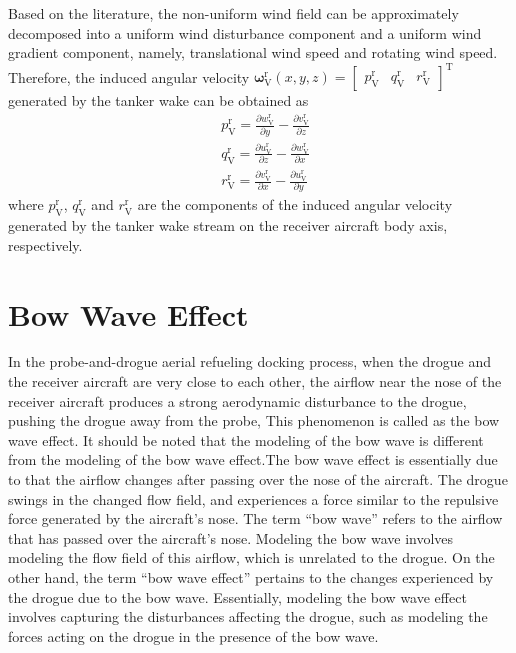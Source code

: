 Based on the literature\cite{pamadi2004performance}, the non-uniform wind field can be approximately decomposed into a uniform wind disturbance component and a uniform wind gradient component, namely, translational wind speed and rotating wind speed. Therefore, the induced angular velocity $\boldsymbol{\omega}_\mathrm{V}^\mathrm{r}\left( {x,y,z} \right) = {\left[ {\begin{array}{*{20}{c}}
		{p_\mathrm{V}^\mathrm{r}}&{q_\mathrm{V}^\mathrm{r}}&{r_\mathrm{V}^\mathrm{r}}
		\end{array}} \right]^\mathrm{T}}$ generated by the tanker wake can be obtained as
\begin{equation}\label{eq19}
\begin{aligned}
& p_{\mathrm{V}}^{\mathrm{r}}=\frac{\partial w_{\mathrm{V}}^{\mathrm{r}}}{\partial y}-\frac{\partial v_{\mathrm{V}}^{\mathrm{r}}}{\partial z} \\
& q_{\mathrm{V}}^{\mathrm{r}}=\frac{\partial u_{\mathrm{V}}^{\mathrm{r}}}{\partial z}-\frac{\partial w_{\mathrm{V}}^{\mathrm{r}}}{\partial x} \\
& r_{\mathrm{V}}^{\mathrm{r}}=\frac{\partial v_{\mathrm{V}}^{\mathrm{r}}}{\partial x}-\frac{\partial u_{\mathrm{V}}^{\mathrm{r}}}{\partial y}
\end{aligned}
\end{equation}
where $p^\mathrm{r}_\mathrm{V}$, $q^\mathrm{r}_\mathrm{V}$ and $r^\mathrm{r}_\mathrm{V}$ are the components of the induced angular velocity generated by the tanker wake stream on the receiver aircraft body axis, respectively.
\section{Bow Wave Effect}
In the probe-and-drogue aerial refueling docking process, when the drogue and the receiver aircraft are very close to each other, the airflow near the nose of the receiver aircraft produces a strong aerodynamic disturbance to the drogue, pushing the drogue away from the probe, This phenomenon is called as the bow wave effect. It should be noted that the modeling of the bow wave is different from the modeling of the bow wave effect.The bow wave effect is essentially due to that the airflow changes after passing over the nose of the aircraft. The drogue swings in the changed flow field, and experiences a force similar to the repulsive force generated by the aircraft's nose. The term ``bow wave'' refers to the airflow that has passed over the aircraft's nose. Modeling the bow wave involves modeling the flow field of this airflow, which
is unrelated to the drogue. On the other hand, the term ``bow wave effect'' pertains to the changes experienced by the drogue due to the bow wave. Essentially, modeling the bow wave effect involves capturing the disturbances affecting the drogue, such as modeling the forces acting on the drogue in the presence of the bow wave.

